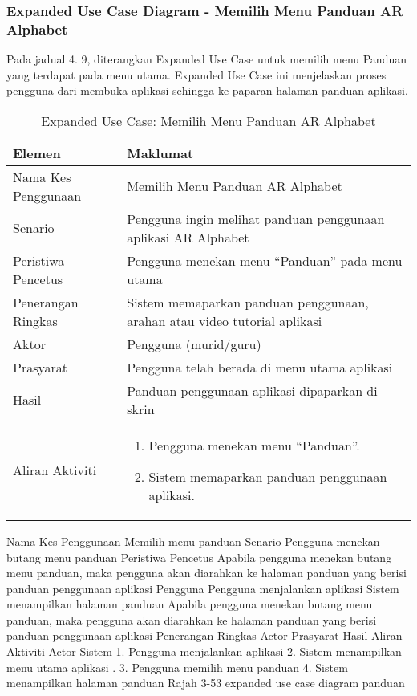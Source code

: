 \begin{itemize}
\begin{itemize}
\begin{itemize}
\begin{itemize}
\begin{itemize}
\begin{itemize}
\begin{itemize}
\begin{itemize}
\subsubsection{Expanded Use Case Diagram - Memilih Menu Panduan AR Alphabet}
Pada jadual 4. 9, diterangkan Expanded Use Case untuk memilih menu Panduan yang terdapat pada menu utama. Expanded Use Case ini menjelaskan proses pengguna dari membuka aplikasi sehingga ke paparan halaman panduan aplikasi.
\begin{table}[htbp]
\centering
\caption{Expanded Use Case: Memilih Menu Panduan AR Alphabet}
\begin{tabular}{lp{10cm}}
\toprule
\textbf{Elemen} & \textbf{Maklumat} \\
\midrule
Nama Kes Penggunaan & Memilih Menu Panduan AR Alphabet \\
Senario & Pengguna ingin melihat panduan penggunaan aplikasi AR Alphabet \\
Peristiwa Pencetus & Pengguna menekan menu “Panduan” pada menu utama \\
Penerangan Ringkas & Sistem memaparkan panduan penggunaan, arahan atau video tutorial aplikasi \\
Aktor & Pengguna (murid/guru) \\
Prasyarat & Pengguna telah berada di menu utama aplikasi \\
Hasil & Panduan penggunaan aplikasi dipaparkan di skrin \\
Aliran Aktiviti & 
\begin{enumerate}
    \item Pengguna menekan menu “Panduan”.
    \item Sistem memaparkan panduan penggunaan aplikasi.
\end{enumerate} \\
\bottomrule
\end{tabular}
\label{jadual:expanded_menu_panduan}
\end{table}

\begin{flushleft} Nama Kes Penggunaan	Memilih menu panduan
Senario	Pengguna menekan butang menu panduan
Peristiwa Pencetus	Apabila pengguna menekan butang menu panduan, maka pengguna akan diarahkan ke halaman panduan yang berisi panduan penggunaan aplikasi   Pengguna
Pengguna menjalankan aplikasi
Sistem menampilkan halaman panduan
Apabila pengguna menekan butang menu panduan, maka pengguna akan diarahkan ke halaman panduan yang berisi panduan penggunaan aplikasi
Penerangan Ringkas	
Actor	
Prasyarat	
Hasil	
Aliran Aktiviti	Actor	Sistem
	1.       Pengguna       menjalankan aplikasi	
		2.   Sistem   menampilkan   menu   utama aplikasi
	. 3.   Pengguna   memilih   menu panduan	
		4. Sistem menampilkan halaman panduan
Rajah 3-53 expanded use case diagram panduan





\end{flushleft}
\end{itemize}
\end{itemize}
\end{itemize}
\end{itemize}
\end{itemize}
\end{itemize}
\end{itemize}
\end{itemize}
